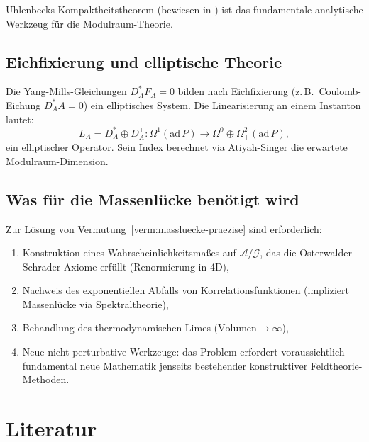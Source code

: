 \documentclass[12pt,a4paper]{amsart}
\theoremstyle{definition}
\theoremstyle{remark}
\begin{document}
Uhlenbecks Kompaktheitstheorem (bewiesen in \cite{Uhlenbeck1982}) ist das fundamentale
analytische Werkzeug für die Modulraum-Theorie.

\subsection{Eichfixierung und elliptische Theorie}

Die Yang-Mills-Gleichungen $D_A^* F_A = 0$ bilden nach Eichfixierung (z.\,B.\ Coulomb-Eichung
$D_A^* A = 0$) ein elliptisches System. Die Linearisierung an einem Instanton lautet:
\[
  L_A = D_A^* \oplus D_A^+: \Omega^1(\mathrm{ad}\, P) \to \Omega^0 \oplus \Omega^2_+(\mathrm{ad}\, P),
\]
ein elliptischer Operator. Sein Index berechnet via Atiyah-Singer die erwartete
Modulraum-Dimension.

\subsection{Was für die Massenlücke benötigt wird}

Zur Lösung von Vermutung~\ref{verm:massluecke-praezise} sind erforderlich:
\begin{enumerate}[noitemsep]
  \item Konstruktion eines Wahrscheinlichkeitsmaßes auf $\mathcal{A}/\mathcal{G}$, das
    die Osterwalder-Schrader-Axiome erfüllt (Renormierung in 4D),
  \item Nachweis des exponentiellen Abfalls von Korrelationsfunktionen (impliziert
    Massenlücke via Spektraltheorie),
  \item Behandlung des thermodynamischen Limes ($\text{Volumen} \to \infty$),
  \item Neue nicht-perturbative Werkzeuge: das Problem erfordert voraussichtlich
    fundamental neue Mathematik jenseits bestehender konstruktiver Feldtheorie-Methoden.
\end{enumerate}

\section{Literatur}
\end{document}
